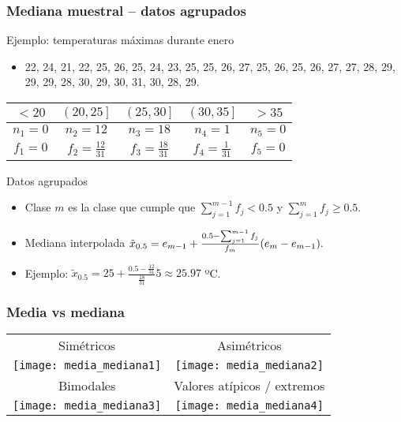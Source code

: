 \documentclass[table]{beamer}
\begin{document}
\begin{frame}
    \frametitle{Mediana muestral -- datos agrupados}
    \begin{exampleblock}{Ejemplo: temperaturas máximas durante enero}
        \begin{itemize}
            \item 22, 24, 21, 22, 25, 26, 25, 24, 23, 25, 25, 26, 27, 25, 26, 25, 26, 27, 27, 28, 29, 29, 29, 28, 30, 29, 30, 31, 30, 28, 29.
        \end{itemize}
        \begin{center}
            \begin{tabular}{c|c|c|c|c}
                $< 20$ & $\left ( 20 , 25 \right ]$ & $\left ( 25 , 30 \right ]$ & $\left ( 30 , 35 \right ]$ & $> 35$ \\
                \hline
                $n_{1} = 0$ & $n_{2} = 12$ & $n_{3} = 18$ & $n_{4} = 1$ & $n_{5} = 0$ \\
                \hline
                $f_{1} = 0$ & $f_{2} = \frac{12}{31}$ & $f_{3} = \frac{18}{31}$ & $f_{4} = \frac{1}{31}$ & $f_{5} = 0$ \\
            \end{tabular}
        \end{center}
    \end{exampleblock}
    \begin{block}{Datos agrupados}
        \begin{itemize}
            \item Clase $m$ es la clase que cumple que $\sum_{j = 1}^{m - 1} f_{j} < 0.5$ y $\sum_{j = 1}^{m} f_{j} \geq 0.5$.
            \item Mediana interpolada $\tilde{x}_{0.5} = e_{m - 1} + \frac{0.5 - \sum_{j = 1}^{m - 1} f_{j}}{f_{m}} \parens{e_{m} - e_{m - 1}}.$
            \item Ejemplo: $\tilde{x}_{0.5} = 25 + \frac{0.5 - \frac{12}{31}}{\frac{18}{31}} 5 \approx 25.97$ ºC.
        \end{itemize}
    \end{block}
\end{frame}

\begin{frame}
    \frametitle{Media vs mediana}
    \begin{center}
        \begin{tabular}{cc}
            Simétricos & Asimétricos \\
            \texttt{[image: media\_mediana1]} &
            \texttt{[image: media\_mediana2]} \\
            Bimodales & Valores atípicos / extremos \\
            \texttt{[image: media\_mediana3]} &
            \texttt{[image: media\_mediana4]}
        \end{tabular}
    \end{center}
\end{frame}
\end{document}
